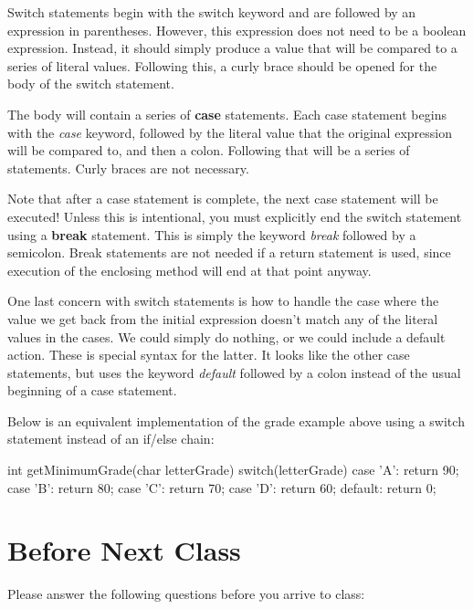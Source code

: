 Switch statements begin with the switch keyword and are followed by an expression in parentheses. However, this expression does not need to be a boolean expression. Instead, it should simply produce a value that will be compared to a series of literal values. Following this, a curly brace should be opened for the body of the switch statement. 

The body will contain a series of \textbf{case} statements. Each case statement begins with the \textit{case} keyword, followed by the literal value that the original expression will be compared to, and then a colon. Following that will be a series of statements. Curly braces are not necessary.

Note that after a case statement is complete, the next case statement will be executed! Unless this is intentional, you must explicitly end the switch statement using a \textbf{break} statement. This is simply the keyword \textit{break} followed by a semicolon. Break statements are not needed if a return statement is used, since execution of the enclosing method will end at that point anyway. 

One last concern with switch statements is how to handle the case where the value we get back from the initial expression doesn't match any of the literal values in the cases. We could simply do nothing, or we could include a default action. These is special syntax for the latter. It looks like the other case statements, but uses the keyword \textit{default} followed by a colon instead of the usual beginning of a case statement.

Below is an equivalent implementation of the grade example above using a switch statement instead of an if/else chain:


\begin{code}
int getMinimumGrade(char letterGrade) {
  switch(letterGrade) {
    case 'A':
      return 90;
    case 'B':
      return 80;
    case 'C':
      return 70;
    case 'D':
      return 60;
    default:
      return 0;
  }
} 
\end{code}

\newpage

\section{Before Next Class}

Please answer the following questions before you arrive to class:

